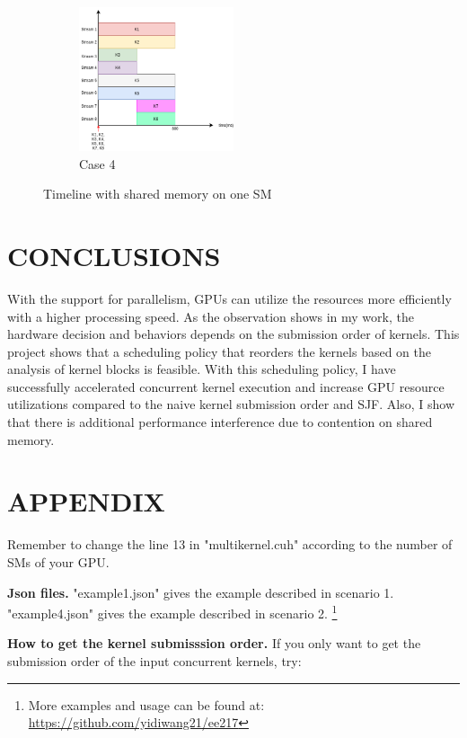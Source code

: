 \documentclass[conference]{IEEEtran}
\begin{document}
\begin{figure}[h]
\begin{subfigure}{0.48\textwidth}
      \includegraphics[width=\textwidth, height=120pt]{figs/shmem_16384.png}
      \caption{Case 4}
      \label{fig:shmem_case4}
   \end{subfigure}
   \caption{Timeline with shared memory on one SM}
   \label{fig:shmem}
\end{figure}



\section{CONCLUSIONS}
With the support for parallelism, GPUs can utilize the resources more efficiently with a higher processing speed. As the observation shows in my work, the hardware decision and behaviors depends on the submission order of kernels. This project shows that a scheduling policy that reorders the kernels based on the analysis of kernel blocks is feasible. With this scheduling policy, I have successfully accelerated concurrent kernel execution and increase GPU resource utilizations compared to the naive kernel submission order and SJF. Also, I show that there is additional performance interference due to contention on shared memory.

\section*{APPENDIX}
Remember to change the line 13 in "multikernel.cuh" according to the number of SMs of your GPU.

\textbf{Json files.}
"example1.json" gives the example described in scenario 1. "example4.json" gives the example described in scenario 2. 
\footnote{More examples and usage can be found at:\\ \url{https://github.com/yidiwang21/ee217}}

\textbf{How to get the kernel submisssion order.}
If you only want to get the submission order of the input concurrent kernels, try: 

\newline
\end{document}
